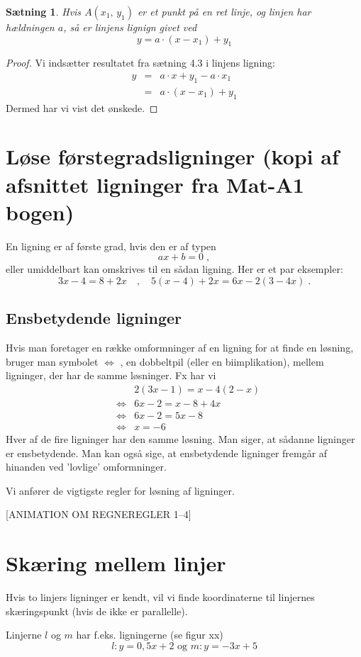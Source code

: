 \documentclass[12pt,oneside,a4paper]{article}
\newcommand{\bas}{\begin{eqnarray*}}
\newcommand{\eas}{\end{eqnarray*}}
\newtheorem{thm}{Sætning}[section]
\begin{document}
\begin{thm}
    Hvis $A(x_1,\,y_1)$ er et punkt på en ret linje, og linjen har hældningen
    $a$, så er linjens lignign givet ved
    $$
    y = a\cdot (x-x_1) + y_1 
    $$
\end{thm}
\begin{proof}
    Vi indsætter resultatet fra sætning 4.3 i linjens ligning:
\bas
y &=& a\cdot x + y_1 - a\cdot x_1 \\
  &=& a\cdot (x-x_1) + y_1 
\eas
Dermed har vi vist det ønskede.
\end{proof}


\section{Løse førstegradsligninger (kopi af afsnittet ligninger fra Mat-A1 bogen)}
En ligning er af første grad, hvis den er af typen
$$
ax + b = 0\; ,
$$
eller umiddelbart kan omskrives til en sådan ligning. Her er et par eksempler:
$$
3x - 4 = 8 + 2x \quad , \quad 5(x - 4) + 2x = 6x - 2(3 - 4x)\; .
$$

\subsection{Ensbetydende ligninger}
Hvis man foretager en række omformninger af en ligning for at finde en løsning,
bruger man symbolet $\iff$ , en dobbeltpil (eller en biimplikation), mellem
ligninger, der har de samme løsninger. Fx har vi
\bas
&& 2(3x - 1) = x - 4(2 - x)\\
&\iff& 6x - 2 = x - 8 + 4x\\
&\iff& 6x - 2 = 5x - 8 \\
&\iff& x = -6 
\eas
Hver af de fire ligninger har den samme løsning. Man siger, at sådanne
ligninger er ensbetydende. Man kan også sige, at ensbetydende ligninger fremgår
af hinanden ved ’lovlige’ omformninger.

Vi anfører de vigtigste regler for løsning af ligninger.

[ANIMATION OM REGNEREGLER 1--4]


\section{Skæring mellem linjer}
Hvis to linjers ligninger er kendt, vil vi finde koordinaterne til linjernes
skæringspunkt (hvis de ikke er parallelle).

Linjerne $l$ og $m$ har f.eks. ligningerne (se figur xx)
$$
l: y=0,5x+2\,\,{\mbox{og}}\,\,m: y=-3x+5
$$
\end{document}
